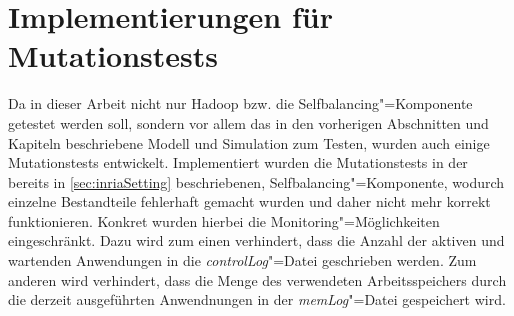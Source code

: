 \section{Implementierungen für Mutationstests}\label{sec:implMutationTests}

Da in dieser Arbeit nicht nur Hadoop bzw. die Selfbalancing"=Komponente getestet werden soll, sondern vor allem das in den vorherigen Abschnitten und Kapiteln beschriebene Modell und Simulation zum Testen, wurden auch einige Mutationstests entwickelt.
Implementiert wurden die Mutationstests in der bereits in \autoref{sec:inriaSetting} beschriebenen, Selfbalancing"=Komponente, wodurch einzelne Bestandteile fehlerhaft gemacht wurden und daher nicht mehr korrekt funktionieren.
Konkret wurden hierbei die Monitoring"=Möglichkeiten eingeschränkt.
Dazu wird zum einen verhindert, dass die Anzahl der aktiven und wartenden Anwendungen in die \emph{controlLog}"=Datei geschrieben werden.
Zum anderen wird verhindert, dass die Menge des verwendeten Arbeitsspeichers durch die derzeit ausgeführten Anwendnungen in der \emph{memLog}"=Datei gespeichert wird.
